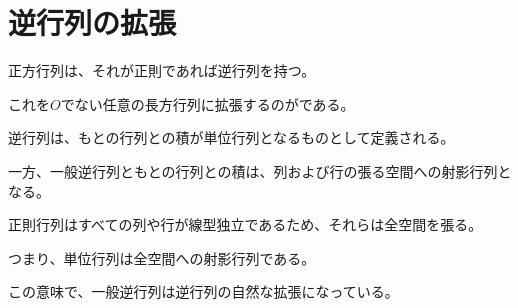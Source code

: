 \documentclass[../../../topic_linear-algebra]{subfiles}
\begin{document}
\sectionline
\section{逆行列の拡張}

正方行列は、それが正則であれば逆行列を持つ。

これを$O$でない任意の長方行列に拡張するのがである。

\br

逆行列は、もとの行列との積が単位行列となるものとして定義される。

一方、一般逆行列ともとの行列との積は、列および行の張る空間への射影行列となる。

\br

正則行列はすべての列や行が線型独立であるため、それらは全空間を張る。

つまり、単位行列は全空間への射影行列である。

\br

この意味で、一般逆行列は逆行列の自然な拡張になっている。
\end{document}
